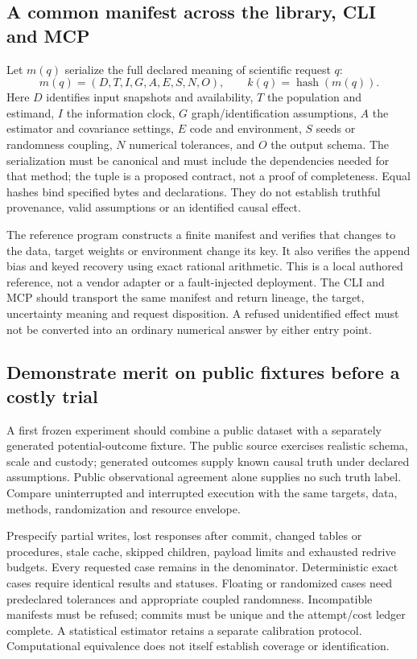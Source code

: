 \subsection{A common manifest across the library, CLI and MCP}

Let $m(q)$ serialize the full declared meaning of scientific request $q$:
\begin{equation}
 m(q)=(D,T,I,G,A,E,S,N,O),\qquad k(q)=\operatorname{hash}(m(q)).
 \label{exec22:workflow-manifest}
\end{equation}
Here $D$ identifies input snapshots and availability, $T$ the population and
estimand, $I$ the information clock, $G$ graph/identification assumptions,
$A$ the estimator and covariance settings, $E$ code and environment, $S$ seeds
or randomness coupling, $N$ numerical tolerances, and $O$ the output schema.
The serialization must be canonical and must include the dependencies needed
for that method; the tuple is a proposed contract, not a proof of completeness.
Equal hashes bind specified bytes and declarations. They do not establish
truthful provenance, valid assumptions or an identified causal effect.

The reference program constructs a finite manifest and verifies that changes
to the data, target weights or environment change its key. It also verifies
the append bias and keyed recovery using exact rational arithmetic. This is
a local authored reference, not a vendor adapter or a fault-injected deployment.
The CLI and MCP should transport the same manifest and return lineage, the
target, uncertainty meaning and request disposition. A refused unidentified
effect must not be converted into an ordinary numerical answer by either
entry point.\citep{exec22_workflow_reference}

\subsection{Demonstrate merit on public fixtures before a costly trial}

A first frozen experiment should combine a public dataset with a separately
generated potential-outcome fixture. The public source exercises realistic
schema, scale and custody; generated outcomes supply known causal truth under
declared assumptions. Public observational agreement alone supplies no such
truth label. Compare uninterrupted and interrupted execution with the same
targets, data, methods, randomization and resource envelope.

Prespecify partial writes, lost responses after commit, changed tables or
procedures, stale cache, skipped children, payload limits and exhausted redrive
budgets. Every requested case remains in the denominator. Deterministic exact
cases require identical results and statuses. Floating or randomized cases
need predeclared tolerances and appropriate coupled randomness. Incompatible
manifests must be refused; commits must be unique and the attempt/cost ledger
complete. A statistical estimator retains a separate calibration protocol.
Computational equivalence does not itself establish coverage or identification.

